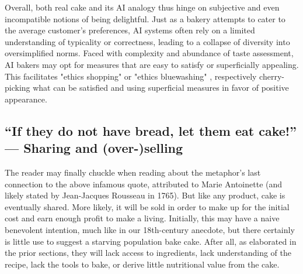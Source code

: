 \documentclass[manuscript,screen,authorversion,nonacm]{acmart}
\begin{document}
Overall, both real cake and its AI analogy thus hinge on subjective and even incompatible notions of being delightful. Just as a bakery attempts to cater to the average customer's preferences, AI systems often rely on a limited understanding of typicality or correctness, leading to a collapse of diversity into oversimplified norms. Faced with complexity and abundance of taste assessment, AI bakers may opt for measures that are easy to satisfy or superficially appealing. This facilitates "ethics shopping" or "ethics bluewashing" \cite{Floridi2019FiveRisksUnethical}, respectively cherry-picking what can be satisfied and using superficial measures in favor of positive appearance.



\subsection{``If they do not have bread, let them eat cake!'' --- Sharing and (over-)selling}
The reader may finally chuckle when reading about the metaphor's last connection to the above infamous quote, attributed to Marie Antoinette (and likely stated by Jean-Jacques Rousseau in 1765). But like any product, cake is eventually shared. More likely, it will be sold in order to make up for the initial cost and earn enough profit to make a living. Initially, this may have a naive benevolent intention, much like in our 18th-century anecdote, but there certainly is little use to suggest a starving population bake cake. After all, as elaborated in the prior sections, they will lack access to ingredients, lack understanding of the recipe, lack the tools to bake, or derive little nutritional value from the cake.
\end{document}
